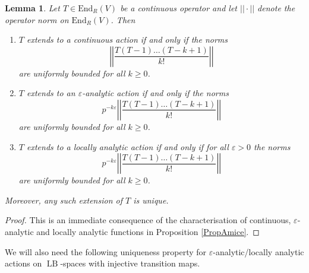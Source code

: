 \documentclass[10pt, oneside]{amsart}
\numberwithin{equation}{subsection}
\newtheorem{lemma}[equation]{Lemma}
\theoremstyle{definition}
\theoremstyle{remark}
\newcommand{\opn}[1]{\operatorname{#1}}
\def\epsilon{\varepsilon}
\begin{document}
\begin{lemma} \label{LemmaExtension}
Let $T \in \mathrm{End}_R(V)$ be a continuous operator and let $|\!| \cdot |\!|$ denote the operator norm on $\mathrm{End}_R(V)$. Then
\begin{enumerate}
    \item $T$ extends to a continuous action if and only if the norms
    \[ \left| \! \left| \frac{T (T - 1) \ldots (T - k + 1)}{k!} \right| \! \right| \]
    are uniformly bounded for all $k \geq 0$.
    \item $T$ extends to an $\epsilon$-analytic action if and only if the norms
    \[ p^{- k \epsilon} \left| \! \left| \frac{T (T-1) \ldots (T - k + 1)}{k!} \right| \! \right| \]
    are uniformly bounded for all $k \geq 0$.
    \item $T$ extends to a locally analytic action if and only if for all $\epsilon > 0$ the norms
    \[ p^{- k \epsilon} \left| \! \left| \frac{T (T-1) \ldots (T - k + 1)}{k!} \right| \! \right| \]
    are uniformly bounded for all $k \geq 0$.
\end{enumerate}
Moreover, any such extension of $T$ is unique.
\end{lemma}

\begin{proof}
This is an immediate consequence of the characterisation of continuous, $\epsilon$-analytic and locally analytic functions in Proposition \ref{PropAmice}.
\end{proof}

We will also need the following uniqueness property for $\varepsilon$-analytic/locally analytic actions on $\opn{LB}$-spaces with injective transition maps.
\end{document}
